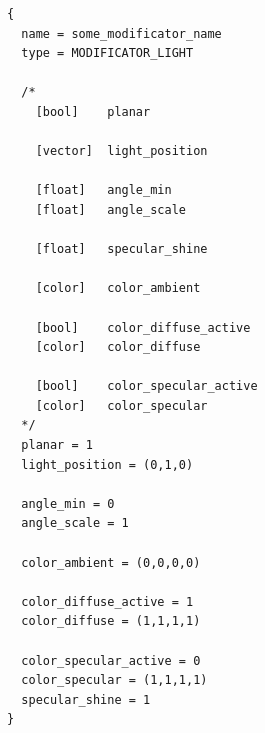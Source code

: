 \documentclass[9pt]{article}
\begin{document}
\begin{verbatim}
{
  name = some_modificator_name
  type = MODIFICATOR_LIGHT

  /*      
    [bool]    planar
      
    [vector]  light_position
      
    [float]   angle_min
    [float]   angle_scale
      
    [float]   specular_shine
      
    [color]   color_ambient
      
    [bool]    color_diffuse_active
    [color]   color_diffuse
      
    [bool]    color_specular_active
    [color]   color_specular
  */
  planar = 1
  light_position = (0,1,0)
  
  angle_min = 0
  angle_scale = 1
  
  color_ambient = (0,0,0,0)
  
  color_diffuse_active = 1
  color_diffuse = (1,1,1,1)
  
  color_specular_active = 0
  color_specular = (1,1,1,1)
  specular_shine = 1
}
\end{verbatim}
\end{document}
